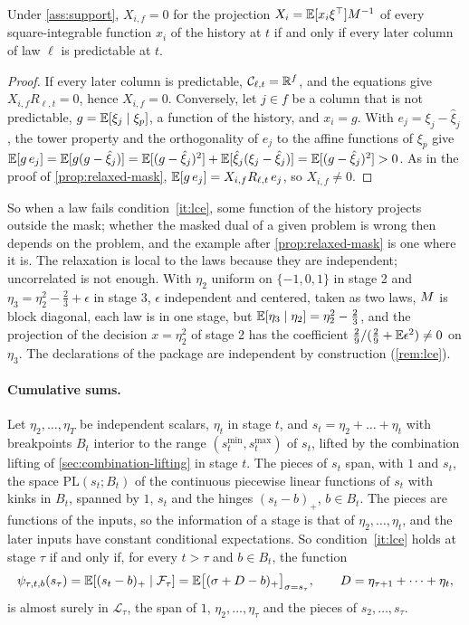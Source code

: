 \begin{corollary}
\label{cor:mask-valid}
Under \cref{ass:support}, $X_{i,f} = 0$ for the projection $X_i = \mathbb{E}[x_i\xi^\top]M^{-1}$ of every square-integrable function $x_i$ of the history at $t$
if and only if every later column of law $\ell$ is predictable at $t$.
\end{corollary}

\begin{proof}
If every later column is predictable, $\mathcal C_{\ell,t} = \mathbb{R}^f$, and the equations give $X_{i,f}R_{\ell,t} = 0$, hence $X_{i,f} = 0$.
Conversely, let $j \in f$ be a column that is not predictable, $g = \mathbb{E}[\xi_j \mid \xi_p]$, a function of the history, and $x_i = g$.
With $e_j = \xi_j - \hat\xi_j$, the tower property and the orthogonality of $e_j$ to the affine functions of $\xi_p$ give
$\mathbb{E}[g\,e_j] = \mathbb{E}[g(g - \hat\xi_j)] = \mathbb{E}[(g - \hat\xi_j)^2] + \mathbb{E}[\hat\xi_j(\xi_j - \hat\xi_j)] = \mathbb{E}[(g - \hat\xi_j)^2] > 0$.
As in the proof of \cref{prop:relaxed-mask}, $\mathbb{E}[g\,e_j] = X_{i,f}R_{\ell,t}\,e_j$, so $X_{i,f} \ne 0$.
\end{proof}

So when a law fails condition~\ref{it:lce}, some function of the history projects outside the mask;
whether the masked dual of a given problem is wrong then depends on the problem, and the example after \cref{prop:relaxed-mask} is one where it is.
The relaxation is local to the laws because they are independent; uncorrelated is not enough.
With $\eta_2$ uniform on $\{-1, 0, 1\}$ in stage 2 and $\eta_3 = \eta_2^2 - \tfrac23 + \epsilon$ in stage 3, $\epsilon$ independent and centered, taken as two laws,
$M$ is block diagonal, each law is in one stage, but $\mathbb{E}[\eta_3 \mid \eta_2] = \eta_2^2 - \tfrac23$,
and the projection of the decision $x = \eta_2^2$ of stage 2 has the coefficient $\tfrac29/(\tfrac29 + \mathbb{E}\epsilon^2) \ne 0$ on $\eta_3$.
The declarations of the package are independent by construction (\cref{rem:lce}).

\paragraph{Cumulative sums.}
Let $\eta_2, \dots, \eta_T$ be independent scalars, $\eta_t$ in stage $t$, and $s_t = \eta_2 + \dots + \eta_t$ with breakpoints $B_t$ interior to the range $(s_t^{\min}, s_t^{\max})$ of $s_t$, lifted by the combination lifting of \cref{sec:combination-lifting} in stage $t$.
The pieces of $s_t$ span, with $1$ and $s_t$, the space $\mathrm{PL}(s_t; B_t)$ of the continuous piecewise linear functions of $s_t$ with kinks in $B_t$, spanned by $1$, $s_t$ and the hinges $(s_t - b)_+$, $b \in B_t$.
The pieces are functions of the inputs, so the information of a stage is that of $\eta_2, \dots, \eta_t$, and the later inputs have constant conditional expectations.
So condition~\ref{it:lce} holds at stage $\tau$ if and only if, for every $t > \tau$ and $b \in B_t$, the function
\[
\psi_{\tau,t,b}(s_\tau) = \mathbb{E}[(s_t - b)_+ \mid \mathcal F_\tau] = \mathbb{E}\bigl[(\sigma + D - b)_+\bigr]_{\sigma = s_\tau},
\qquad D = \eta_{\tau+1} + \dots + \eta_t,
\]
is almost surely in $\mathcal L_\tau$, the span of $1$, $\eta_2, \dots, \eta_\tau$ and the pieces of $s_2, \dots, s_\tau$.

